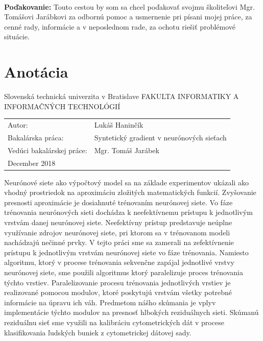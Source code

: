 \documentclass[12pt, twoside]{book}
\newcommand{\itab}[1]{\hspace{0em}\rlap{#1}}
\newcommand{\tab}[1]{\hspace{.31\textwidth}\rlap{#1}}
\begin{document}
 
~

\vfill
{\bf Poďakovanie:} Touto cestou by som sa chcel poďakovať svojmu školiteľovi Mgr. Tomášovi Jarábkovi za odbornú pomoc a usmernenie pri písani mojej práce, za cenné rady, informácie a v neposlednom rade, za ochotu riešiť problémové situácie.
\newpage 
\afterpage{\null\thispagestyle{empty}\newpage}


\section*{Anotácia}
Slovenská technická univerzita v Bratislave
\newline
FAKULTA INFORMATIKY A INFORMAČNÝCH TECHNOLÓGIÍ
\newline
\itab{Študijný program:}    \tab{Informatika}
\begin{table}[h!]
\renewcommand{\arraystretch}{1.4}
\begin{tabular}{@{}ll}
Autor: & Lukáš Haninčík \\
Bakalárska práca: & Syntetický gradient v neurónových sieťach \\
Vedúci bakalárskej práce: & Mgr. Tomáš Jarábek \\
December 2018
\end{tabular}
\end{table}
\newline
\newline
Neurónové siete ako výpočtový model sa na základe experimentov ukázali ako vhodný prostriedok na aproximáciu zložitých matematických funkcií. Zvyšovanie presnosti aproximácie je dosiahnuté trénovaním neurónovej siete. Vo fáze trénovania neurónových sieti dochádza k neefektívnemu prístupu k jednotlivým vrstvám danej neurónovej siete. Neefektívny prístup predstavuje neúplne využívanie zdrojov neurónovej siete, pri ktorom sa v trénovanom modeli nachádzajú nečinné prvky. V tejto práci sme sa zamerali na zefektívnenie prístupu k jednotlivým vrstvám neurónovej siete vo fáze trénovania. Namiesto algoritmu, ktorý v procese trénovania sekvenčne zapájal jednotlivé vrstvy neurónovej siete, sme použili algoritmus ktorý paralelizuje proces trénovania týchto vrstiev. Paralelizovanie procesu trénovania jednotlivých vrstiev je realizované pomocou modulov, ktoré poskytujú vrstvám všetky potrebné informácie na úpravu ich váh. Predmetom nášho skúmania je vplyv implementácie týchto modulov na presnosť hlbokých reziduálnych sieti. Skúmanú reziduálnu sieť sme využili na kalibráciu cytometrických dát v procese klasifikovania ľudských buniek z cytometrickej dátovej sady. 
\end{document}
